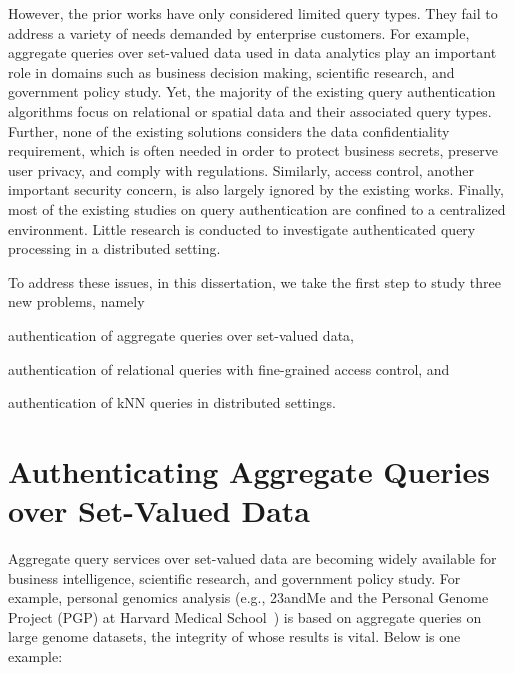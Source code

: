 However, the prior works have only considered limited query types. They fail to address a variety of needs demanded by enterprise customers. For example, aggregate queries over set-valued data used in data analytics play an important role in domains such as business decision making, scientific research, and government policy study. Yet, the majority of the existing query authentication algorithms focus on relational or spatial data and their associated query types. Further, none of the existing solutions considers the data confidentiality requirement, which is often needed in order to protect business secrets, preserve user privacy, and comply with regulations. Similarly, access control, another important security concern, is also largely ignored by the existing works. Finally, most of the existing studies on query authentication are confined to a centralized environment. Little research is conducted to investigate authenticated query processing in a distributed setting.

To address these issues, in this dissertation, we take the first step to study three new problems, namely
\begin{inlineenum}
  \item authentication of aggregate queries over set-valued data,
  \item authentication of relational queries with fine-grained access control, and
  \item authentication of {kNN} queries in distributed settings.
\end{inlineenum}

\section{Authenticating Aggregate Queries over Set-Valued Data}

Aggregate query services over set-valued data are becoming widely available for business intelligence, scientific research, and government policy study. For example, personal genomics analysis (e.g., 23andMe and the Personal Genome Project (PGP) at Harvard Medical School~\cite{pgp}) is based on aggregate queries on large genome datasets, the integrity of whose results is vital. Below is one example:

